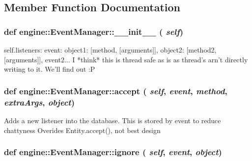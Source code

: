 \subsection{Member Function Documentation}
\hypertarget{classengine_1_1EventManager_a9937f92e3a44e5db7cb0cff939a7e3a9}{
\subsubsection[{\_\-\_\-init\_\-\_\-}]{\setlength{\rightskip}{0pt plus 5cm}def engine::EventManager::\_\-\_\-init\_\-\_\- ( {\em self})}}
\label{classengine_1_1EventManager_a9937f92e3a44e5db7cb0cff939a7e3a9}
\begin{DoxyVerb}
self.listeners: {event: {object1: [method, [arguments]], object2: [method2, [arguments]]}, event2... }
I *think* this is thread safe as is as thread's arn't directly writing to it.
We'll find out :P
\end{DoxyVerb}
 \hypertarget{classengine_1_1EventManager_a4c2fe323a92b282bfc2b41f45db2c622}{
\subsubsection[{accept}]{\setlength{\rightskip}{0pt plus 5cm}def engine::EventManager::accept ( {\em self}, \/   {\em event}, \/   {\em method}, \/   {\em extraArgs}, \/   {\em object})}}
\label{classengine_1_1EventManager_a4c2fe323a92b282bfc2b41f45db2c622}
\begin{DoxyVerb}
Adds a new listener into the database.  This is stored by event to reduce chattyness
Overides Entity.accept(), not best design
\end{DoxyVerb}
 \hypertarget{classengine_1_1EventManager_a3cbecffdaca2a66699c41f3b2ff8d5ae}{
\subsubsection[{ignore}]{\setlength{\rightskip}{0pt plus 5cm}def engine::EventManager::ignore ( {\em self}, \/   {\em event}, \/   {\em object})}}
\label{classengine_1_1EventManager_a3cbecffdaca2a66699c41f3b2ff8d5ae}
